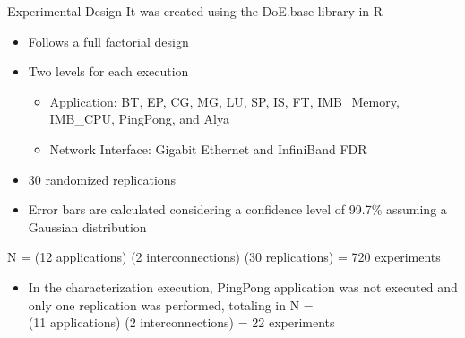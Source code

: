 \documentclass{beamer}
\begin{document}
\begin{frame}{Experimental Design}
It was created using the DoE.base library in R
\begin{itemize}
    \item Follows a full factorial design
    \pause\item Two levels for each execution
 \begin{itemize}
\item Application: \alert{BT}, \alert{EP}, \alert{CG}, \alert{MG}, \alert{LU}, \alert{SP}, \alert{IS}, \alert{FT}, \alert{IMB\_Memory}, \alert{IMB\_CPU}, \alert{PingPong}, and \alert{Alya}
\item Network Interface: \alert{Gigabit Ethernet} and \alert{InfiniBand FDR}
\end{itemize}
    \pause\item 30 randomized replications
    \pause\item Error bars are calculated considering a \alert{confidence level of 99.7\%} assuming a Gaussian distribution
   \end{itemize}
\pause N = (12 applications) \texttimes{} (2 interconnections) \texttimes{} (30 replications) = 720 experiments
\pause \begin{itemize}
    \item In the characterization execution, PingPong application was not executed and only one replication was performed, totaling in N = \\(11 applications) \texttimes{} (2 interconnections) = 22 experiments  

\end{itemize}
\end{frame}
\end{document}
